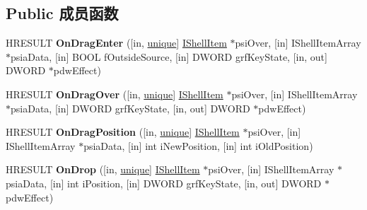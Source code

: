 \subsection*{Public 成员函数}
\begin{DoxyCompactItemize}
\item 
\mbox{\label{interface_i_name_space_tree_control_drop_handler_a40bc5b04eb0705ecf27b601a8476dc1e}} 
H\+R\+E\+S\+U\+LT {\bfseries On\+Drag\+Enter} (\mbox{[}in, \hyperlink{interfaceunique}{unique}\mbox{]} \hyperlink{interface_i_shell_item}{I\+Shell\+Item} $\ast$psi\+Over, \mbox{[}in\mbox{]} I\+Shell\+Item\+Array $\ast$psia\+Data, \mbox{[}in\mbox{]} B\+O\+OL f\+Outside\+Source, \mbox{[}in\mbox{]} D\+W\+O\+RD grf\+Key\+State, \mbox{[}in, out\mbox{]} D\+W\+O\+RD $\ast$pdw\+Effect)
\item 
\mbox{\label{interface_i_name_space_tree_control_drop_handler_aa555a04ec9187857d81047618006dfb0}} 
H\+R\+E\+S\+U\+LT {\bfseries On\+Drag\+Over} (\mbox{[}in, \hyperlink{interfaceunique}{unique}\mbox{]} \hyperlink{interface_i_shell_item}{I\+Shell\+Item} $\ast$psi\+Over, \mbox{[}in\mbox{]} I\+Shell\+Item\+Array $\ast$psia\+Data, \mbox{[}in\mbox{]} D\+W\+O\+RD grf\+Key\+State, \mbox{[}in, out\mbox{]} D\+W\+O\+RD $\ast$pdw\+Effect)
\item 
\mbox{\label{interface_i_name_space_tree_control_drop_handler_a7b91c799cc43656212c3aae5bb15261a}} 
H\+R\+E\+S\+U\+LT {\bfseries On\+Drag\+Position} (\mbox{[}in, \hyperlink{interfaceunique}{unique}\mbox{]} \hyperlink{interface_i_shell_item}{I\+Shell\+Item} $\ast$psi\+Over, \mbox{[}in\mbox{]} I\+Shell\+Item\+Array $\ast$psia\+Data, \mbox{[}in\mbox{]} int i\+New\+Position, \mbox{[}in\mbox{]} int i\+Old\+Position)
\item 
\mbox{\label{interface_i_name_space_tree_control_drop_handler_a2d686a54832a0d2ac98b850c2e77fd88}} 
H\+R\+E\+S\+U\+LT {\bfseries On\+Drop} (\mbox{[}in, \hyperlink{interfaceunique}{unique}\mbox{]} \hyperlink{interface_i_shell_item}{I\+Shell\+Item} $\ast$psi\+Over, \mbox{[}in\mbox{]} I\+Shell\+Item\+Array $\ast$psia\+Data, \mbox{[}in\mbox{]} int i\+Position, \mbox{[}in\mbox{]} D\+W\+O\+RD grf\+Key\+State, \mbox{[}in, out\mbox{]} D\+W\+O\+RD $\ast$pdw\+Effect)

\end{DoxyCompactItemize}
